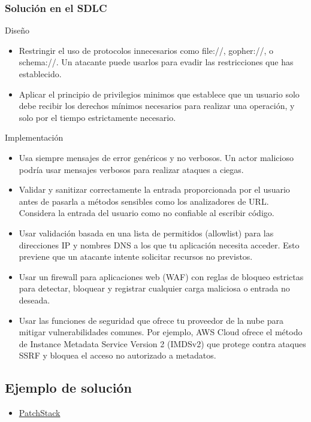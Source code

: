 \subsubsection{Solución en el SDLC}
Diseño
\begin{itemize}
    \item Restringir el uso de protocolos innecesarios como file://, gopher://, o schema://. Un atacante puede usarlos para evadir las restricciones que has establecido.
    \item Aplicar el principio de privilegios minimos que establece que un usuario solo debe recibir los derechos mínimos necesarios para realizar una operación, y solo por el tiempo estrictamente necesario.

\end{itemize}
Implementación
\begin{itemize}
    \item Usa siempre mensajes de error genéricos y no verbosos. Un actor malicioso podría usar mensajes verbosos para realizar ataques a ciegas.
    \item Validar y sanitizar correctamente la entrada proporcionada por el usuario antes de pasarla a métodos sensibles como los analizadores de URL. Considera la entrada del usuario como no confiable al escribir código.
    \item Usar validación basada en una lista de permitidos (allowlist) para las direcciones IP y nombres DNS a los que tu aplicación necesita acceder. Esto previene que un atacante intente solicitar recursos no previstos.
    \item Usar un firewall para aplicaciones web (WAF) con reglas de bloqueo estrictas para detectar, bloquear y registrar cualquier carga maliciosa o entrada no deseada.
    \item Usar las funciones de seguridad que ofrece tu proveedor de la nube para mitigar vulnerabilidades comunes. Por ejemplo, AWS Cloud ofrece el método de Instance Metadata Service Version 2 (IMDSv2) que protege contra ataques SSRF y bloquea el acceso no autorizado a metadatos.
    
\end{itemize}
\subsection*{Ejemplo de solución}

\begin{itemize}
    \item \href{https://patchstack.com/academy/wordpress/securing-code/server-side-request-forgery/}{PatchStack}
\end{itemize}

